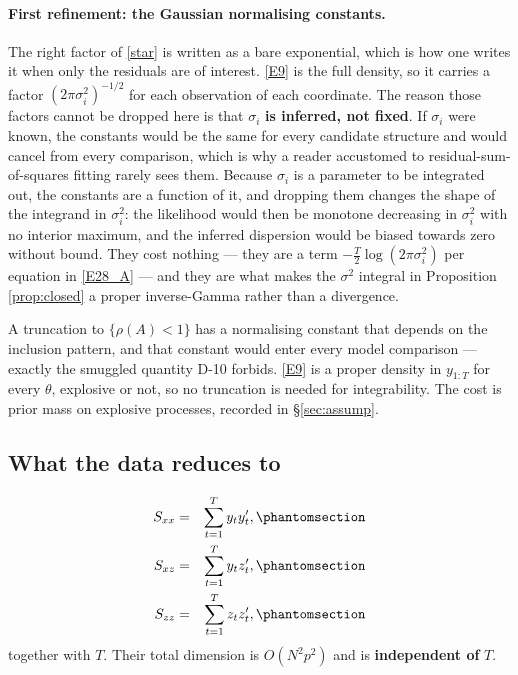 \paragraph{First refinement: the Gaussian normalising constants.} The right factor of
\eqref{star} is written as a bare exponential, which is how one writes it when only
the residuals are of interest. \eqref{E9} is the full density, so it carries a factor
$(2\pi\sigma_i^2)^{-1/2}$ for each observation of each coordinate. The reason those
factors cannot be dropped here is that $\sigma_i$ \textbf{is inferred, not fixed}. If
$\sigma_i$ were known, the constants would be the same for every candidate structure
and would cancel from every comparison, which is why a reader accustomed to
residual-sum-of-squares fitting rarely sees them. Because $\sigma_i$ is a parameter
to be integrated out, the constants are a function of it, and dropping them changes
the shape of the integrand in $\sigma_i^2$: the likelihood would then be monotone
decreasing in $\sigma_i^2$ with no interior maximum, and the inferred dispersion
would be biased towards zero without bound. They cost nothing --- they are a term
$-\frac{T}{2}\log(2\pi\sigma_i^2)$ per equation in \eqref{E28_A} --- and they are what
makes the $\sigma^2$ integral in Proposition \ref{prop:closed} a proper
inverse-Gamma rather than a divergence.

\begin{remark}\label{rem:trunc}
A truncation to $\{\rho(A)<1\}$ has a normalising constant that depends on the
inclusion pattern, and that constant would enter every model comparison --- exactly
the smuggled quantity D-10 forbids. \eqref{E9} is a proper density in $y_{1:T}$ for
every $\theta$, explosive or not, so no truncation is needed for integrability. The
cost is prior mass on explosive processes, recorded in \S\ref{sec:assump}.
\end{remark}

\subsection{What the data reduces to}

\begin{definition}\label{def:stats}
\begin{eqnarray}
S_{xx} &=& \sum_{t=1}^{T} y_t y_t',
  \Elabel{E-26A}{E26_A} \\
S_{xz} &=& \sum_{t=1}^{T} y_t z_t',
  \Elabel{E-26B}{E26_B} \\
S_{zz} &=& \sum_{t=1}^{T} z_t z_t',
  \Elabel{E-26C}{E26_C}
\end{eqnarray}
together with $T$. Their total dimension is $O(N^2p^2)$ and is \textbf{independent
of} $T$.
\end{definition}

